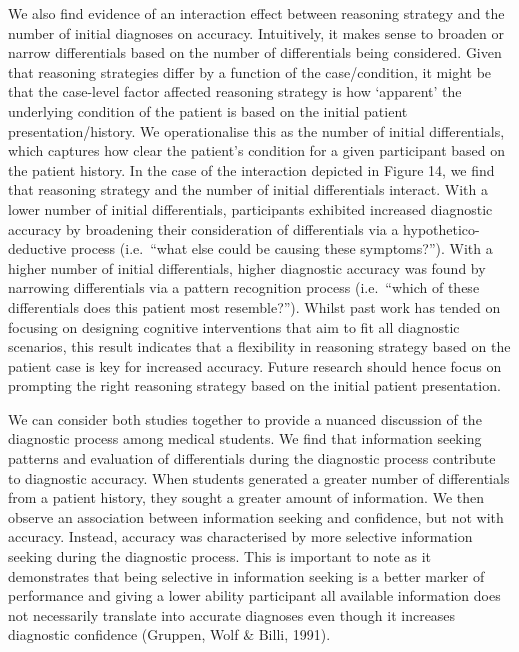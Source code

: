 \documentclass[a4paper, nobind]{templates/ociamthesis}
\begin{document}
We also find evidence of an interaction effect between reasoning strategy and the number of initial diagnoses on accuracy. Intuitively, it makes sense to broaden or narrow differentials based on the number of differentials being considered. Given that reasoning strategies differ by a function of the case/condition, it might be that the case-level factor affected reasoning strategy is how `apparent' the underlying condition of the patient is based on the initial patient presentation/history. We operationalise this as the number of initial differentials, which captures how clear the patient's condition for a given participant based on the patient history. In the case of the interaction depicted in Figure 14, we find that reasoning strategy and the number of initial differentials interact. With a lower number of initial differentials, participants exhibited increased diagnostic accuracy by broadening their consideration of differentials via a hypothetico-deductive process (i.e.~``what else could be causing these symptoms?''). With a higher number of initial differentials, higher diagnostic accuracy was found by narrowing differentials via a pattern recognition process (i.e.~``which of these differentials does this patient most resemble?''). Whilst past work has tended on focusing on designing cognitive interventions that aim to fit all diagnostic scenarios, this result indicates that a flexibility in reasoning strategy based on the patient case is key for increased accuracy. Future research should hence focus on prompting the right reasoning strategy based on the initial patient presentation.

We can consider both studies together to provide a nuanced discussion of the diagnostic process among medical students. We find that information seeking patterns and evaluation of differentials during the diagnostic process contribute to diagnostic accuracy. When students generated a greater number of differentials from a patient history, they sought a greater amount of information. We then observe an association between information seeking and confidence, but not with accuracy. Instead, accuracy was characterised by more selective information seeking during the diagnostic process. This is important to note as it demonstrates that being selective in information seeking is a better marker of performance and giving a lower ability participant all available information does not necessarily translate into accurate diagnoses even though it increases diagnostic confidence (Gruppen, Wolf \& Billi, 1991).
\end{document}
